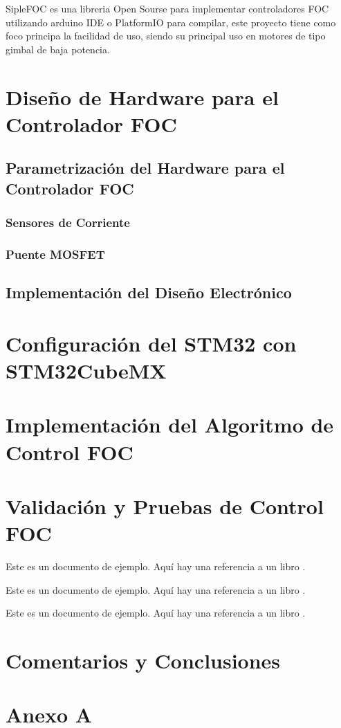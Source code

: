 \documentclass[11pt]{report}
\begin{document}
SipleFOC \cite{Skuric_SimpleFOC_A_Field_2022} es una libreria Open Sourse para implementar controladores FOC utilizando arduino IDE o PlatformIO para compilar, este proyecto tiene como foco principa la facilidad de uso, siendo su principal uso en motores de tipo gimbal de baja potencia.

\newpage
\chapter{Diseño de Hardware para el Controlador FOC}
\section{Parametrización del Hardware para el Controlador FOC}
\subsection{Sensores de Corriente}
\subsection{Puente MOSFET}
\section{Implementación del Diseño Electrónico}

\newpage
\chapter{Configuración del STM32 con STM32CubeMX}

\newpage
\chapter{Implementación del Algoritmo de Control FOC}

\newpage
\chapter{Validación y Pruebas de Control FOC}
Este es un documento de ejemplo. Aquí hay una referencia a un libro \cite[p 200]{power_conv_00}.

Este es un documento de ejemplo. Aquí hay una referencia a un libro \cite[p 200]{AN2757_00}.

Este es un documento de ejemplo. Aquí hay una referencia a un libro \cite{odrive_SVM}.

\newpage
\chapter*{Comentarios y Conclusiones}

\newpage
{}
\printbibliography

\newpage
{}

\chapter*{Anexo A}
\end{document}
